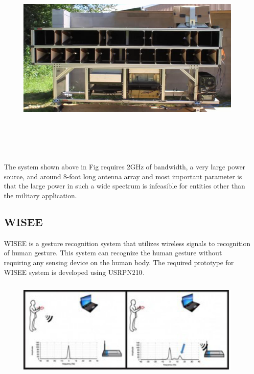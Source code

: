 \documentclass[a4paper,12pt,oneside]{article}
\begin{document}
\begin{figure}[H]
\centering
\includegraphics[height=10cm,width=14cm]{1.png}
\end{figure}

\paragraph{}
The system shown above in Fig requires 2GHz of bandwidth, a very large power
source, and around 8-foot long antenna array and most important parameter is that the large
power in such a wide spectrum is infeasible for entities other than the military application.
\subsection{WISEE}
\paragraph{}
WISEE is a gesture recognition system that utilizes wireless signals to recognition of
human gesture. This system can recognize the human gesture without requiring any sensing
device on the human body. The required prototype for WISEE system is developed using USRPN210.

\begin{figure}[H]
\centering
\includegraphics[height=5cm,width=12cm]{2.png}
\end{figure}
\end{document}
